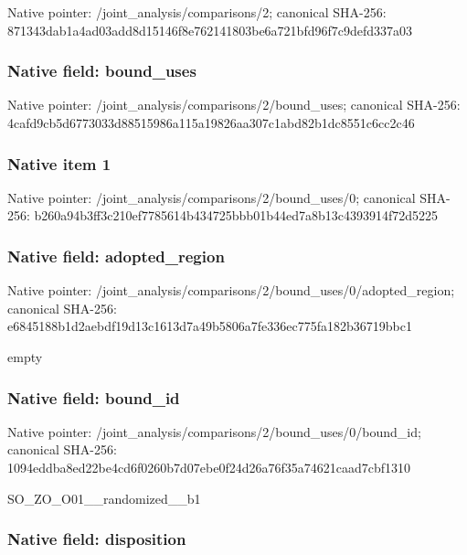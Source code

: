 \documentclass[10pt,a4paper]{article}
\begin{document}
Native pointer: /joint\_analysis/comparisons/2; canonical SHA-256: 871343dab1a4ad03add8d151\allowbreak{}46f8e762141803be6a721bfd\allowbreak{}96f7c9defd337a03



\subsubsection{Native field: bound\_uses}


Native pointer: /joint\_analysis/comparis\allowbreak{}ons/2/bound\_uses; canonical SHA-256: 4cafd9cb5d6773033d885159\allowbreak{}86a115a19826aa307c1abd82\allowbreak{}b1dc8551c6cc2c46



\subsubsection{Native item 1}


Native pointer: /joint\_analysis/comparis\allowbreak{}ons/2/bound\_uses/0; canonical SHA-256: b260a94b3ff3c210ef778561\allowbreak{}4b434725bbb01b44ed7a8b13\allowbreak{}c4393914f72d5225



\subsubsection{Native field: adopted\_region}


Native pointer: /joint\_analysis/comparis\allowbreak{}ons/2/bound\_uses/0/adopt\allowbreak{}ed\_region; canonical SHA-256: e6845188b1d2aebdf19d13c1\allowbreak{}613d7a49b5806a7fe336ec77\allowbreak{}5fa182b36719bbc1


empty


\subsubsection{Native field: bound\_id}


Native pointer: /joint\_analysis/comparis\allowbreak{}ons/2/bound\_uses/0/bound\allowbreak{}\_id; canonical SHA-256: 1094eddba8ed22be4cd6f026\allowbreak{}0b7d07ebe0f24d26a76f35a7\allowbreak{}4621caad7cbf1310


SO\_ZO\_O01\_\_randomized\_\_b1


\subsubsection{Native field: disposition}
\end{document}
